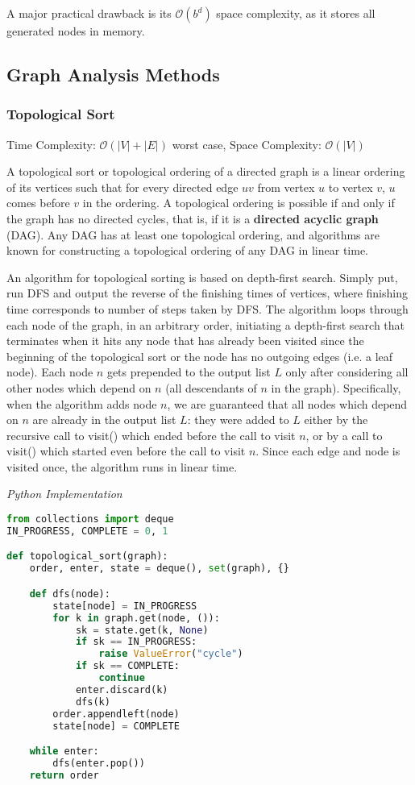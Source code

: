 \documentclass{article}
\newcommand{\bigO}{\mathcal{O}}
\begin{document}
    A major practical drawback is its $\bigO(b^d)$ space complexity, as it stores all generated nodes in memory.
   
    
    \subsection{Graph Analysis Methods}
    \subsubsection{Topological Sort}
    Time Complexity: $\bigO(|V| + |E|)$ worst case,  Space Complexity: $\bigO(|V|)$
    
    A topological sort or topological ordering of a directed graph is a linear ordering of its vertices such that for every directed edge $uv$ from vertex $u$ to vertex $v$, $u$ comes before $v$ in the ordering. A topological ordering is possible if and only if the graph has no directed cycles, that is, if it is a \textbf{directed acyclic graph} (DAG). Any DAG has at least one topological ordering, and algorithms are known for constructing a topological ordering of any DAG in linear time.
    
    An algorithm for topological sorting is based on depth-first search. Simply put, run DFS and output the reverse of the finishing times of vertices, where finishing time corresponds to number of steps taken by DFS. The algorithm loops through each node of the graph, in an arbitrary order, initiating a depth-first search that terminates when it hits any node that has already been visited since the beginning of the topological sort or the node has no outgoing edges (i.e. a leaf node). Each node $n$ gets prepended to the output list $L$ only after considering all other nodes which depend on $n$ (all descendants of $n$ in the graph). Specifically, when the algorithm adds node $n$, we are guaranteed that all nodes which depend on $n$ are already in the output list $L$: they were added to $L$ either by the recursive call to visit() which ended before the call to visit $n$, or by a call to visit() which started even before the call to visit $n$. Since each edge and node is visited once, the algorithm runs in linear time.

\vspace{8pt} \emph{Python Implementation}
\begin{lstlisting}[language=Python]
from collections import deque
IN_PROGRESS, COMPLETE = 0, 1

def topological_sort(graph):
    order, enter, state = deque(), set(graph), {}

    def dfs(node):
        state[node] = IN_PROGRESS
        for k in graph.get(node, ()):
            sk = state.get(k, None)
            if sk == IN_PROGRESS:
                raise ValueError("cycle")
            if sk == COMPLETE:
                continue
            enter.discard(k)
            dfs(k)
        order.appendleft(node)
        state[node] = COMPLETE

    while enter:
        dfs(enter.pop())
    return order
\end{lstlisting}
\end{document}
